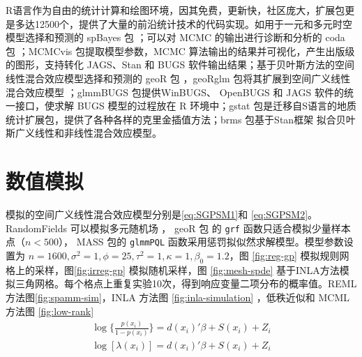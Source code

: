 \documentclass[hyperref, a4paper, UTF8, zihao = -4, linespread = 1.25, scheme = chinese]{ctexbook}
\begin{document}
R语言作为自由的统计计算和绘图环境，因其免费，更新快，社区庞大，扩展包更是多达12500个，提供了大量的前沿统计技术的代码实现。如用于一元和多元时空模型选择和预测的
spBayes 包 \citep{spBayes2015}；可以对 MCMC 的输出进行诊断和分析的 coda
包 \citep{coda2006}；MCMCvis 包提取模型参数，MCMC
算法输出的结果并可视化，产生出版级的图形，支持转化 JAGS、Stan 和 BUGS
软件输出结果\citep{R-MCMCvis}；基于贝叶斯方法的空间线性混合效应模型选择和预测的
geoR 包 \citep{geoR2001}，geoRglm 包将其扩展到空间广义线性混合效应模型
\citep{geoRglm2002}；glmmBUGS 包提供WinBUGS、 OpenBUGS 和 JAGS
软件的统一接口，使求解 BUGS 模型的过程放在 R
环境中\citep{R-glmmBUGS, glmmBUGS2010MCMC}；gstat
包是迁移自S语言的地质统计扩展包，提供了各种各样的克里金插值方法\citep{gstat2004, gstat2016}；brms
包基于Stan框架
拟合贝叶斯广义线性和非线性混合效应模型\citep{brms2017JSS}。

\hypertarget{simulations}{%
\chapter{数值模拟}\label{simulations}}

模拟的空间广义线性混合效应模型分别是\eqref{eq:SGPSM1}和
\eqref{eq:SGPSM2}。RandomFields 可以模拟多元随机场
\citep{RandomFields2015}， geoR 包\citep{R-geoR} 的 \texttt{grf}
函数只适合模拟少量样本点（\(n < 500\)）， MASS 包的 \texttt{glmmPQL}
函数采用惩罚拟似然求解模型\citep{MASS2002}。模型参数设置为
\(n=1600,\sigma^2=1,\phi=25,\tau^2=1,\kappa=1,\beta_0=1.2\)，图
\ref{fig:reg-gp} 模拟规则网格上的采样，图\ref{fig:irreg-gp}
模拟随机采样，图 \ref{fig:mesh-spde}
基于INLA方法模拟三角网格。每个格点上重复实验10次，得到响应变量二项分布的概率值。REML
方法图\ref{fig:spamm-sim}，INLA 方法图 \ref{fig:inla-simulation}
，低秩近似和 MCML 方法图 \ref{fig:low-rank}\begin{gather}
\log\big\{\frac{p(x_i)}{1-p(x_i)}\big\} = d(x_i)'\beta + S(x_i) + Z_i \label{eq:SGPSM1}\\
\log[\lambda(x_i)] = d(x_i)'\beta + S(x_i) + Z_i \label{eq:SGPSM2}
\end{gather}
\end{document}

